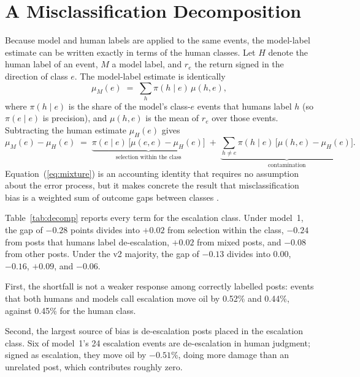 \documentclass[12pt]{article}
\begin{document}
\section{A Misclassification Decomposition}

Because model and human labels are applied to the same events, the model-label estimate can be written exactly in terms of the human classes. Let $H$ denote the human label of an event, $M$ a model label, and $r_e$ the return signed in the direction of class $e$. The model-label estimate is identically
\begin{equation}
\mu_M(e) \;=\; \sum_{h} \pi(h \mid e)\,\mu(h, e),
\label{eq:mixture}
\end{equation}
where $\pi(h \mid e)$ is the share of the model's class-$e$ events that humans label $h$ (so $\pi(e \mid e)$ is precision), and $\mu(h, e)$ is the mean of $r_e$ over those events. Subtracting the human estimate $\mu_H(e)$ gives
\begin{equation}
\mu_M(e) - \mu_H(e) \;=\; \underbrace{\pi(e \mid e)\,\big[\mu(e, e) - \mu_H(e)\big]}_{\text{selection within the class}} \;+\; \underbrace{\sum_{h \neq e} \pi(h \mid e)\,\big[\mu(h, e) - \mu_H(e)\big]}_{\text{contamination}}.
\label{eq:gap}
\end{equation}
Equation~(\ref{eq:mixture}) is an accounting identity that requires no assumption about the error process, but it makes concrete the result that misclassification bias is a weighted sum of outcome gaps between classes \citep{aigner1973, mahajan2006, lewbel2007}.

Table~\ref{tab:decomp} reports every term for the escalation class. Under model~1, the gap of $-0.28$ points divides into $+0.02$ from selection within the class, $-0.24$ from posts that humans label de-escalation, $+0.02$ from mixed posts, and $-0.08$ from other posts. Under the v2 majority, the gap of $-0.13$ divides into 0.00, $-0.16$, $+0.09$, and $-0.06$.

First, the shortfall is not a weaker response among correctly labelled posts: events that both humans and models call escalation move oil by 0.52\% and 0.44\%, against 0.45\% for the human class.

Second, the largest source of bias is de-escalation posts placed in the escalation class. Six of model~1's 24 escalation events are de-escalation in human judgment; signed as escalation, they move oil by $-0.51$\%, doing more damage than an unrelated post, which contributes roughly zero.
\end{document}

